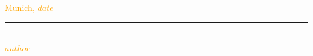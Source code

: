 \documentclass[12pt]{article}
\begin{document}
\vspace{1cm}
\textcolor{orange}{Munich, $date$} \\

\vspace{3cm}

\noindent\rule{0.5\textwidth}{0.4pt} \\

\textcolor{orange}{$author$}

\end{document}
